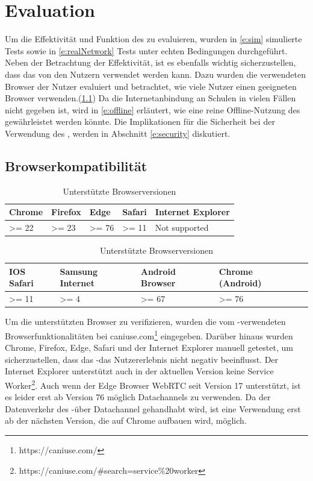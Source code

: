 \chapter{Evaluation}\label{ch:evaluation}
Um die Effektivität und Funktion des \cdns zu evaluieren, wurden in \ref{e:sim} simulierte Tests sowie in \ref{e:realNetwork} Tests unter echten Bedingungen durchgeführt. Neben der Betrachtung der Effektivität, ist es ebenfalls wichtig sicherzustellen, dass das \cdn von den Nutzern verwendet werden kann. Dazu wurden die verwendeten Browser der Nutzer evaluiert und betrachtet, wie viele Nutzer einen geeigneten Browser verwenden.(\ref{e:browserSup}) Da die Internetanbindung an Schulen in vielen Fällen nicht gegeben ist, wird in \ref{e:offline} erläutert, wie eine reine Offline-Nutzung des \cdns gewährleistet werden könnte. Die Implikationen für die Sicherheit bei der Verwendung des \cdns, werden in Abschnitt \ref{e:security} diskutiert.  

\section{Browserkompatibilität}\label{e:browserSup}
\begin{table}[!htb]
\begin{center}

	\begin{tabular}{|l|l|l|l|l|}
		\hline
		Chrome & Firefox & Edge & Safari & Internet Explorer	  \\ \hline
		>= 22 	   &>= 23 	  &>= 76	 &>= 11	  & Not supported    				\\ \hline
	\end{tabular}
	
	\begin{tabular}{|l|l|l|l|l|}
		\hline
		IOS Safari & Samsung Internet & Android Browser	& Chrome (Android) \\ \hline
		>= 11	   &>=  4				  &>=  67				&>=  76  \\ \hline
	\end{tabular}

	\caption{Unterstützte Browserversionen}
\end{center}
\end{table}

Um die unterstützten Browser zu verifizieren, wurden die vom \pTp-\cdn verwendeten Browserfunktionalitäten bei caniuse.com\footnote{https://caniuse.com/} eingegeben. Darüber hinaus wurden Chrome, Firefox, Edge, Safari und der Internet Explorer manuell getestet, um sicherzustellen, dass das \pTp-\cdn das Nutzererlebnis nicht negativ beeinflusst. Der Internet Explorer unterstützt auch in der aktuellen Version keine Service Worker\footnote{https://caniuse.com/\#search=service\%20worker}. Auch wenn der Edge Browser WebRTC seit Version 17 unterstützt, ist es leider erst ab Version 76 möglich Datachannels zu verwenden. Da der Datenverkehr des \pTp-\cdns über Datachannel gehandhabt wird, ist eine Verwendung erst ab der nächsten Version, die auf Chrome aufbauen wird, möglich.

